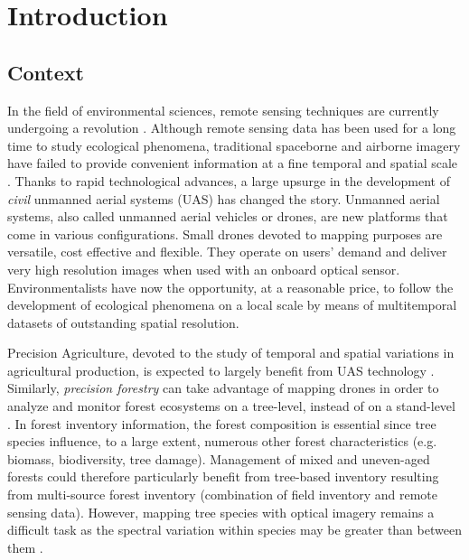 \documentclass[remotesensing,article,submit,moreauthors,pdftex,12pt,a4paper]{mdpi} %
\begin{document}
\section{Introduction}

\subsection{Context}

In the field of environmental sciences, remote sensing techniques are currently undergoing a revolution \cite{anderson_lightweight_2013}. 
Although remote sensing data has been used for a long time to study ecological phenomena, traditional spaceborne and airborne imagery have failed to provide convenient information at a fine temporal and spatial scale \cite{anderson_lightweight_2013}. 
Thanks to rapid technological advances, a large upsurge in the development of \textit{civil} unmanned aerial systems (UAS) has changed the story. 
Unmanned aerial systems, also called unmanned aerial vehicles or drones, are new platforms that come in various configurations. 
Small drones devoted to mapping purposes are versatile, cost effective and flexible. 
They operate on users' demand and deliver very high resolution images when used with an onboard optical sensor. 
Environmentalists have now the opportunity, at a reasonable price, to follow the development of ecological phenomena on a local scale by means of multitemporal datasets of outstanding spatial resolution.

Precision Agriculture, devoted to the study of temporal and spatial variations in agricultural production, is expected to largely benefit from UAS technology \cite{hunt_acquisition_2010}. 
Similarly, \textit{ precision forestry} can take advantage of mapping drones in order to analyze and monitor forest ecosystems on a tree-level, instead of on a stand-level \cite{drauschke_towards_2014}. 
In forest inventory information, the forest composition is essential since tree species influence, to a large extent, numerous other forest characteristics (e.g. biomass, biodiversity, tree damage). 
Management of mixed and uneven-aged forests could therefore particularly benefit from tree-based inventory resulting from multi-source forest inventory (combination of field inventory and remote sensing data).
However, mapping tree species with optical imagery remains a difficult task as the spectral variation within species may be greater than between them \cite{key_comparison_2001,hill_mapping_2010, burkholder_seasonal_2011}.
\end{document}
